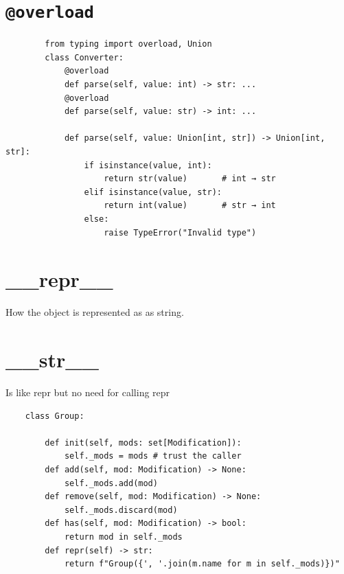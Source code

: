 \section{\texttt{@overload}}
    \begin{verbatim}
        from typing import overload, Union
        class Converter:
            @overload
            def parse(self, value: int) -> str: ...
            @overload
            def parse(self, value: str) -> int: ...
        
            def parse(self, value: Union[int, str]) -> Union[int, str]:
                if isinstance(value, int):
                    return str(value)       # int → str
                elif isinstance(value, str):
                    return int(value)       # str → int
                else:
                    raise TypeError("Invalid type")
    \end{verbatim}

\section{\_\_repr\_\_}

How the object is represented as as string.

\section{\_\_str\_\_}


Is like repr but no need for calling repr

\begin{verbatim}
    class Group:

        def init(self, mods: set[Modification]):
            self._mods = mods # trust the caller
        def add(self, mod: Modification) -> None:
            self._mods.add(mod)
        def remove(self, mod: Modification) -> None:
            self._mods.discard(mod)
        def has(self, mod: Modification) -> bool:
            return mod in self._mods
        def repr(self) -> str:
            return f"Group({', '.join(m.name for m in self._mods)})"
\end{verbatim}

